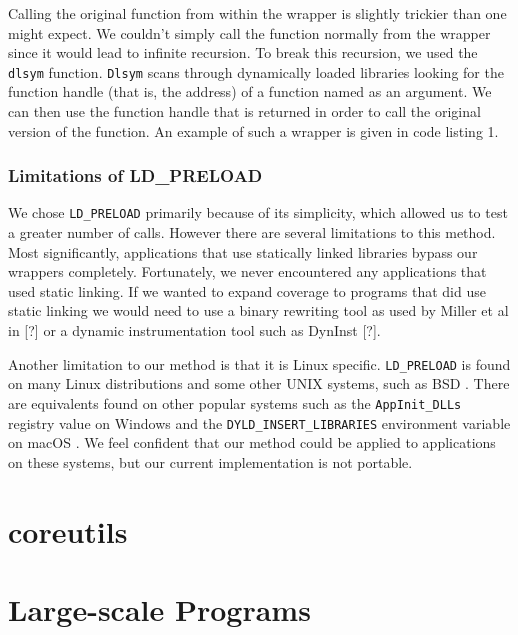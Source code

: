\documentclass[10pt]{article}
\begin{document}
Calling the original function from within the wrapper is slightly trickier than one might expect. We couldn't simply call the function normally from the wrapper since it would lead to infinite recursion. To break this recursion, we used the \texttt{dlsym} function. \texttt{Dlsym} scans through dynamically loaded libraries looking for the function handle (that is, the address) of a function named as an argument. We can then use the function handle that is returned in order to call the original version of the function. An example of such a wrapper is given in code listing 1.

\begin{minipage}{\linewidth} %
	
\end{minipage}

\subsubsection{Limitations of LD\_PRELOAD}
We chose \texttt{LD\_PRELOAD} primarily because of its simplicity, which allowed us to test a greater number of calls. However there are several limitations to this method. Most significantly, applications that use statically linked libraries bypass our wrappers completely. Fortunately, we never encountered any applications that used static linking. If we wanted to expand coverage to programs that did use static linking we would need to use a binary rewriting tool as used by Miller et al in [?] or a dynamic instrumentation tool such as DynInst [?].

Another limitation to our method is that it is Linux specific. \texttt{LD\_PRELOAD} is found on many Linux distributions and some other UNIX systems, such as BSD \cite{bsd}. There are equivalents found on other popular systems such as the \texttt{AppInit\_DLLs} registry value on Windows \cite{dll} and the \texttt{DYLD\_INSERT\_LIBRARIES} environment variable on macOS \cite{macos}. We feel confident that our method could be applied to applications on these systems, but our current implementation is not portable.



\section{coreutils}

\section{Large-scale Programs}

\end{document}
